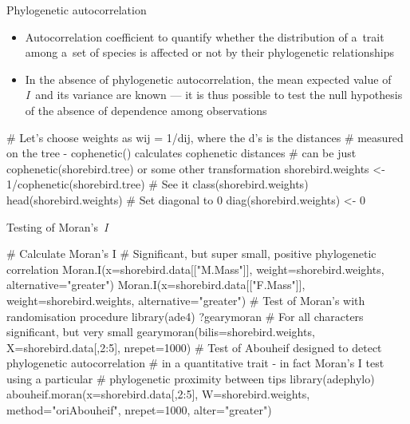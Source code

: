 \documentclass[compress, xelatex, 11pt, xcolor=svgnames, aspectratio=169, url={hyphens, lowtilde}]{beamer}
\begin{document}
\begin{frame}[fragile]{Phylogenetic autocorrelation}
	\begin{itemize}
		\item Autocorrelation coefficient to quantify whether the distribution of a~trait among a~set of species is affected or not by their phylogenetic relationships
		\item In the absence of phylogenetic autocorrelation, the mean expected value of \textit{I}~and its variance are known --- it is thus possible to test the null hypothesis of the absence of dependence among observations
	\end{itemize}
	\begin{spluscode}
    # Let's choose weights as wij = 1/dij, where the d’s is the distances
    # measured on the tree - cophenetic() calculates cophenetic distances
    # can be just cophenetic(shorebird.tree) or some other transformation
    shorebird.weights <- 1/cophenetic(shorebird.tree)
    # See it
    class(shorebird.weights)
    head(shorebird.weights)
    # Set diagonal to 0
    diag(shorebird.weights) <- 0
	\end{spluscode}
\end{frame}

\begin{frame}[fragile]{Testing of Moran's~\textit{I}}
	\begin{spluscode}
    # Calculate Moran's I
    # Significant, but super small, positive phylogenetic correlation
    Moran.I(x=shorebird.data[["M.Mass"]], weight=shorebird.weights,
      alternative="greater")
    Moran.I(x=shorebird.data[["F.Mass"]], weight=shorebird.weights,
      alternative="greater")
    # Test of Moran's with randomisation procedure
    library(ade4)
    ?gearymoran
    # For all characters significant, but very small
    gearymoran(bilis=shorebird.weights, X=shorebird.data[,2:5], nrepet=1000)
    # Test of Abouheif designed to detect phylogenetic autocorrelation
    # in a quantitative trait - in fact Moran's I test using a particular
    # phylogenetic proximity between tips
    library(adephylo)
    abouheif.moran(x=shorebird.data[,2:5], W=shorebird.weights,
      method="oriAbouheif", nrepet=1000, alter="greater")
	\end{spluscode}
\end{frame}
\end{document}
